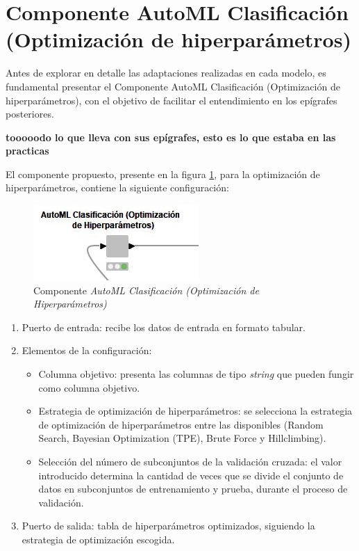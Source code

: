 \section{Componente AutoML Clasificación (Optimización de hiperparámetros)}
Antes de explorar en detalle las adaptaciones realizadas en cada modelo, es fundamental presentar el Componente AutoML Clasificación (Optimización de hiperparámetros), con el objetivo de facilitar el entendimiento en los epígrafes posteriores. 

\textbf{tooooodo lo que lleva con sus epígrafes, esto es lo que estaba en las practicas}

El componente propuesto, presente en la figura \ref{fig:automl-componente-hpo}, para la optimización de hiperparámetros, contiene la siguiente configuración:
\begin{figure}[H]
	\centering
	\includegraphics[width=0.35\linewidth]{"figuras/capi 2/automl-componente-hpo"}
	\caption[Componente AutoML Clasificación (Optimización de Hiperparámetros)]{Componente \textit{AutoML Clasificación (Optimización de Hiperparámetros)}}
	\label{fig:automl-componente-hpo}
\end{figure}
\begin{enumerate}
	\item Puerto de entrada: recibe los datos de entrada en formato tabular.
	\item Elementos de la configuración:
	\begin{itemize}
		\item Columna objetivo: presenta las columnas de tipo \textit{string} que pueden fungir como columna objetivo.
		\item Estrategia de optimización de hiperparámetros: se selecciona la estrategia de optimización de hiperparámetros entre las disponibles (Random Search, Bayesian Optimization (TPE), Brute Force y Hillclimbing).
		\item Selección del número de subconjuntos de la validación cruzada: el valor introducido determina la cantidad de veces que se divide el conjunto de datos en subconjuntos de entrenamiento y prueba, durante el proceso de validación.
	\end{itemize}
	\item Puerto de salida: tabla de hiperparámetros optimizados, siguiendo la estrategia de optimización escogida.
\end{enumerate}

